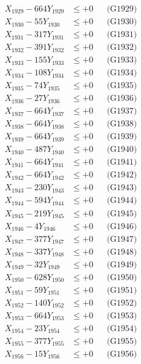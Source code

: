 \documentclass[a4paper,10pt]{article}
\begin{document}
{\begin{align}
X_{1929} - 664Y_{1929} &\leq +0 && \text{(G1929)} \\
X_{1930} - 55Y_{1930} &\leq +0 && \text{(G1930)} \\
\allowbreak
X_{1931} - 317Y_{1931} &\leq +0 && \text{(G1931)} \\
X_{1932} - 391Y_{1932} &\leq +0 && \text{(G1932)} \\
X_{1933} - 155Y_{1933} &\leq +0 && \text{(G1933)} \\
X_{1934} - 108Y_{1934} &\leq +0 && \text{(G1934)} \\
X_{1935} - 74Y_{1935} &\leq +0 && \text{(G1935)} \\
X_{1936} - 27Y_{1936} &\leq +0 && \text{(G1936)} \\
X_{1937} - 664Y_{1937} &\leq +0 && \text{(G1937)} \\
X_{1938} - 664Y_{1938} &\leq +0 && \text{(G1938)} \\
X_{1939} - 664Y_{1939} &\leq +0 && \text{(G1939)} \\
X_{1940} - 487Y_{1940} &\leq +0 && \text{(G1940)} \\
\allowbreak
X_{1941} - 664Y_{1941} &\leq +0 && \text{(G1941)} \\
X_{1942} - 664Y_{1942} &\leq +0 && \text{(G1942)} \\
X_{1943} - 230Y_{1943} &\leq +0 && \text{(G1943)} \\
X_{1944} - 594Y_{1944} &\leq +0 && \text{(G1944)} \\
X_{1945} - 219Y_{1945} &\leq +0 && \text{(G1945)} \\
X_{1946} - 4Y_{1946} &\leq +0 && \text{(G1946)} \\
X_{1947} - 377Y_{1947} &\leq +0 && \text{(G1947)} \\
X_{1948} - 337Y_{1948} &\leq +0 && \text{(G1948)} \\
X_{1949} - 32Y_{1949} &\leq +0 && \text{(G1949)} \\
X_{1950} - 628Y_{1950} &\leq +0 && \text{(G1950)} \\
\allowbreak
X_{1951} - 59Y_{1951} &\leq +0 && \text{(G1951)} \\
X_{1952} - 140Y_{1952} &\leq +0 && \text{(G1952)} \\
X_{1953} - 664Y_{1953} &\leq +0 && \text{(G1953)} \\
X_{1954} - 23Y_{1954} &\leq +0 && \text{(G1954)} \\
X_{1955} - 377Y_{1955} &\leq +0 && \text{(G1955)} \\
X_{1956} - 15Y_{1956} &\leq +0 && \text{(G1956)} \\

\end{align}}
\end{document}
